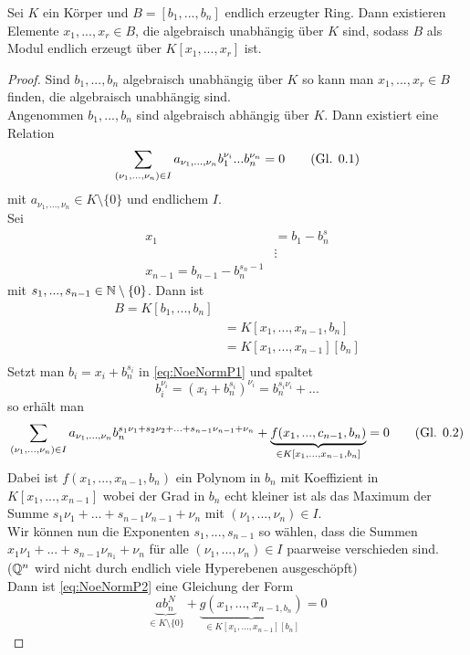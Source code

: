 	\begin{theorem}\label{satz:501NeoNorm}
		Sei $K$ ein Körper und $B=[b_1,...,b_n]$ endlich erzeugter Ring. Dann existieren Elemente $x_1,...,x_r\in B$, die algebraisch unabhängig über $K$ sind, sodass $B$ als Modul endlich erzeugt über $K[x_1,...,x_r]$ ist.
	\end{theorem}
	\begin{proof}
		Sind $b_1,...,b_n$ algebraisch unabhängig über $K$ so kann man $x_1,...,x_r\in B$ finden, die algebraisch unabhängig sind.\\
		Angenommen $b_1,...,b_n$ sind algebraisch abhängig über $K$. Dann existiert eine Relation
		\[\sum_{(\nu_1,...,\nu_n)\in I}a_{\nu_1,...,\nu_n}b_1^{\nu_i}...b_n^{\nu_n}=0\autotag\label{eq:NoeNormP1}\]
		mit $a_{\nu_1,...,\nu_n}\in K\setminus\{0\}$ und endlichem $I$.\\
		Sei
		\begin{align*}
		x_1&=b_1-b_n^{s}\\
		&\vdots\\
		x_{n-1}=b_{n-1}-b_n^{s_n-1}
		\end{align*}
		mit $s_1,...,s_{n-1}\in\mathbb{N}\setminus\{0\}$. Dann ist
		\begin{align*}
		B=K[b_1,...,b_n]\\
		&=K[x_1,...,x_{n-1},b_n]\\
		&=K[x_1,...,x_{n-1}][b_n]\\
		\end{align*}
		Setzt man $b_i=x_i+b_n^{s_i}$ in \ref{eq:NoeNormP1} und spaltet
		\[b_i^{\nu_i}=(x_i+b_n^{s_i})^{\nu_i}=b_n^{s_i\nu_i}+...\]
		so erhält man
		\[\sum_{(\nu_1,...,\nu_n)\in I} a_{\nu_1,...,\nu_n}b_n^{s_1\nu_1+s_2\nu_2+...+s_{n-1}\nu_{n-1}+\nu_n}+\underbrace{f(x_1,...,c_{n-1},b_n)}_{\in K[x_1,...,x_{n-1},b_n]}=0\autotag\label{eq:NoeNormP2}\]
		Dabei ist $f(x_1,...,x_{n-1},b_n)$ ein Polynom in $b_n$ mit Koeffizient in $K[x_1,...,x_{n-1}]$ wobei der Grad in $b_n$ echt kleiner ist als das Maximum der Summe $s_1\nu_1+...+s_{n-1}\nu_{n-1}+\nu_n$ mit $(\nu_1,...,\nu_n)\in I$.\\
		Wir können nun die Exponenten $s_1,...,s_{n-1}$ so wählen, dass die Summen $x_1\nu_1+...+s_{n-1}\nu_{n_1}+\nu_n$ für alle $(\nu_1,...,\nu_n)\in I$ paarweise verschieden sind.\\
		($\mathbb{Q}^n$ wird nicht durch endlich viele Hyperebenen ausgeschöpft)\\
		Dann ist \ref{eq:NoeNormP2} eine Gleichung der Form
		\[\underbrace{ab_n^{N}}_{\in K\setminus\{0\}}+\underbrace{g(x_1,...,x_{n-1,b_n})}_{\in K[x_1,...,x_{n-1}][b_n]}=0\]

\end{proof}
